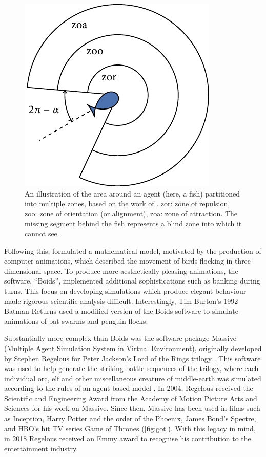 \begin{figure}[tb]
  \includegraphics{zonal_tikz.pdf}
  \caption{An illustration of the area around an agent (here, a fish)
    partitioned into multiple zones, based on the work of
    \textcite{aoki82}. zor: zone of repulsion, zoo: zone of orientation (or
    alignment), zoa: zone of attraction. The missing segment behind the
    fish represents a blind zone into which it cannot see.}
  \label{fig:zone_illustration}
\end{figure}

Following this, \textcite{reynolds87} formulated a mathematical model,
motivated by the production of computer animations, which described the
movement of birds flocking in three-dimensional space. To produce more
aesthetically pleasing animations, the software, ``Boids'', implemented
additional sophistications such as banking during turns. This focus on
developing simulations which produce elegant behaviour made rigorous scientific
analysis difficult. Interestingly, Tim Burton's 1992 Batman Returns used a
modified version of the Boids software to simulate animations of bat swarms and
penguin flocks.

Substantially more complex than Boids was the software package Massive
(Multiple Agent Simulation System in Virtual Environment), originally developed
by Stephen Regelous for Peter Jackson's Lord of the Rings trilogy
\parencite{koeppel02}. This software was used to help generate the striking
battle sequences of the trilogy, where each individual orc, elf and other
miscellaneous creature of middle-earth was simulated according to the rules of
an agent based model \parencite{robbins17}. In 2004, Regelous received the
Scientific and Engineering Award from the Academy of Motion Picture Arts and
Sciences for his work on Massive. Since then, Massive has been used in films
such as Inception, Harry Potter and the order of the Phoenix, James Bond's
Spectre, and HBO's hit TV series Game of Thrones (\cref{fig:got}). With this
legacy in mind, in 2018 Regelous received an Emmy award to recognise his
contribution to the entertainment industry.

